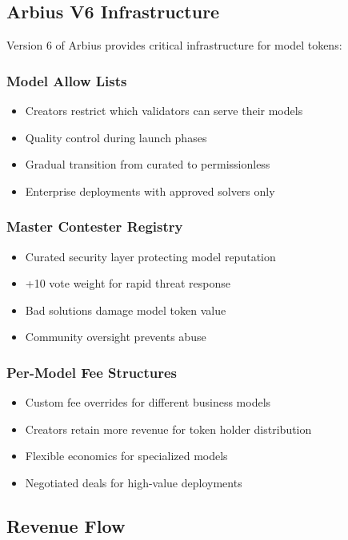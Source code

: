 \documentclass{article}
\begin{document}
\subsection{Arbius V6 Infrastructure}

Version 6 of Arbius provides critical infrastructure for model tokens:

\subsubsection{Model Allow Lists}
\begin{itemize}
    \item Creators restrict which validators can serve their models
    \item Quality control during launch phases
    \item Gradual transition from curated to permissionless
    \item Enterprise deployments with approved solvers only
\end{itemize}

\subsubsection{Master Contester Registry}
\begin{itemize}
    \item Curated security layer protecting model reputation
    \item +10 vote weight for rapid threat response
    \item Bad solutions damage model token value
    \item Community oversight prevents abuse
\end{itemize}

\subsubsection{Per-Model Fee Structures}
\begin{itemize}
    \item Custom fee overrides for different business models
    \item Creators retain more revenue for token holder distribution
    \item Flexible economics for specialized models
    \item Negotiated deals for high-value deployments
\end{itemize}

\subsection{Revenue Flow}
\end{document}
